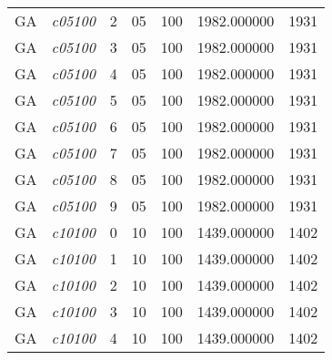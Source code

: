 {\begin{longtable}{cc|c|cc|cc}
			GA                 & \textit{c05100}    & 2                               & 05               & 100              & 1982.000000                          & 1931 \\  
			GA                 & \textit{c05100}    & 3                               & 05               & 100              & 1982.000000                          & 1931 \\  
			GA                 & \textit{c05100}    & 4                               & 05               & 100              & 1982.000000                          & 1931 \\  
			GA                 & \textit{c05100}    & 5                               & 05               & 100              & 1982.000000                          & 1931 \\  
			GA                 & \textit{c05100}    & 6                               & 05               & 100              & 1982.000000                          & 1931 \\  
			GA                 & \textit{c05100}    & 7                               & 05               & 100              & 1982.000000                          & 1931 \\  
			GA                 & \textit{c05100}    & 8                               & 05               & 100              & 1982.000000                          & 1931 \\  
			GA                 & \textit{c05100}    & 9                               & 05               & 100              & 1982.000000                          & 1931 \\  \hline
			GA                 & \textit{c10100}    & 0                               & 10               & 100              & 1439.000000                          & 1402 \\  
			GA                 & \textit{c10100}    & 1                               & 10               & 100              & 1439.000000                          & 1402 \\  
			GA                 & \textit{c10100}    & 2                               & 10               & 100              & 1439.000000                          & 1402 \\  
			GA                 & \textit{c10100}    & 3                               & 10               & 100              & 1439.000000                          & 1402 \\  
			GA                 & \textit{c10100}    & 4                               & 10               & 100              & 1439.000000                          & 1402 \\  

\end{longtable}}
